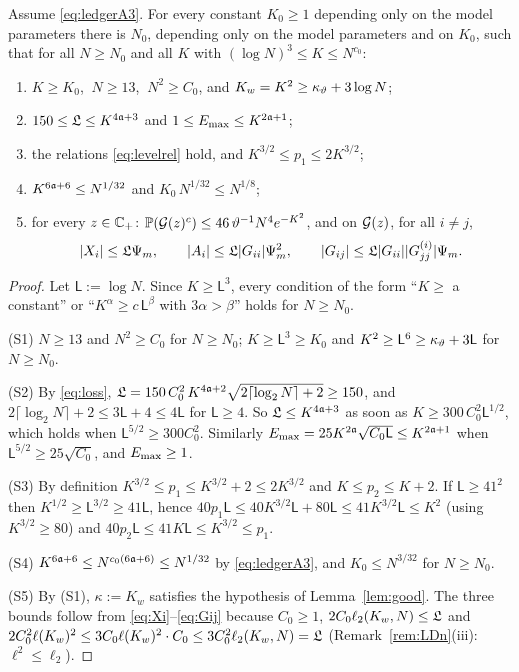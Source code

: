 \begin{lemma}\label{lem:levels}
Assume \eqref{eq:ledgerA3}. For every constant $K_0\ge1$ depending only on the model parameters there is $N_0$, depending only on the model parameters and on $K_0$, such that for all $N\ge N_0$ and all $K$ with $(\log N)^3\le K\le N^{c_0}$:
\begin{enumerate}[label=\textup{(S\arabic*)},leftmargin=2.8em,itemsep=1pt]
\item $K\ge K_0$, $\ N\ge13$, $\ N^2\ge C_0$, and $K_w=K^2\ge\kappa_\vartheta+3\log N$;
\item $150\le\mathfrak{L}\le K^{4\mathfrak{a}+3}$ and $1\le E_{\max}\le K^{2\mathfrak{a}+1}$;
\item the relations \eqref{eq:levelrel} hold, and $K^{3/2}\le p_1\le2K^{3/2}$;
\item $K^{6\mathfrak{a}+6}\le N^{1/32}$ and $K_0\,N^{1/32}\le N^{1/8}$;
\item for every $z\in\mathbb{C}_+$: $\mathbb{P}(\mathcal{G}(z)^c)\le46\,\vartheta^{-1}N^4e^{-K^2}$, and on $\mathcal{G}(z)$, for all $i\ne j$,
\[
 |X_i|\le\mathfrak{L}\Psi_m,\qquad|A_i|\le\mathfrak{L}|G_{ii}|\Psi_m^2,\qquad|G_{ij}|\le\mathfrak{L}|G_{ii}||G^{(i)}_{jj}|\Psi_m .
\]
\end{enumerate}
\end{lemma}
\begin{proof}
Let $\mathsf L:=\log N$. Since $K\ge\mathsf L^3$, every condition of the form ``$K\ge$ a constant'' or ``$K^{\alpha}\ge c\,\mathsf L^{\beta}$ with $3\alpha>\beta$'' holds for $N\ge N_0$.

(S1) $N\ge13$ and $N^2\ge C_0$ for $N\ge N_0$; $K\ge\mathsf L^3\ge K_0$ and $K^2\ge\mathsf L^6\ge\kappa_\vartheta+3\mathsf L$ for $N\ge N_0$.

(S2) By \eqref{eq:loss}, $\mathfrak{L}=150\,C_0^2\,K^{4\mathfrak{a}+2}\sqrt{2\lceil\log_2N\rceil+2}\ge150$, and $2\lceil\log_2N\rceil+2\le3\mathsf L+4\le4\mathsf L$ for $\mathsf L\ge4$. So $\mathfrak{L}\le K^{4\mathfrak{a}+3}$ as soon as $K\ge300\,C_0^2\mathsf L^{1/2}$,
which holds when $\mathsf L^{5/2}\ge300C_0^2$. Similarly $E_{\max}=25K^{2\mathfrak{a}}\sqrt{C_0\mathsf L}\le K^{2\mathfrak{a}+1}$ when $\mathsf L^{5/2}\ge25\sqrt{C_0}$, and $E_{\max}\ge1$.

(S3) By definition $K^{3/2}\le p_1\le K^{3/2}+2\le2K^{3/2}$ and $K\le p_2\le K+2$. If $\mathsf L\ge41^2$ then $K^{1/2}\ge\mathsf L^{3/2}\ge41\mathsf L$, hence
$40p_1\mathsf L\le40K^{3/2}\mathsf L+80\mathsf L\le41K^{3/2}\mathsf L\le K^2$ (using $K^{3/2}\ge80$) and $40p_2\mathsf L\le41K\mathsf L\le K^{3/2}\le p_1$.

(S4) $K^{6\mathfrak{a}+6}\le N^{c_0(6\mathfrak{a}+6)}\le N^{1/32}$ by \eqref{eq:ledgerA3}, and $K_0\le N^{3/32}$ for $N\ge N_0$.

(S5) By (S1), $\kappa:=K_w$ satisfies the hypothesis of Lemma~\ref{lem:good}. The three bounds follow from \eqref{eq:Xi}--\eqref{eq:Gij} because $C_0\ge1$, $2C_0\ell_2(K_w,N)\le\mathfrak{L}$ and $2C_0^2\ell(K_w)^2\le3C_0\ell(K_w)^2\cdot C_0\le3C_0^2\ell_2(K_w,N)=\mathfrak{L}$ (Remark~\ref{rem:LDn}(iii): $\ell^2\le\ell_2$).
\end{proof}
